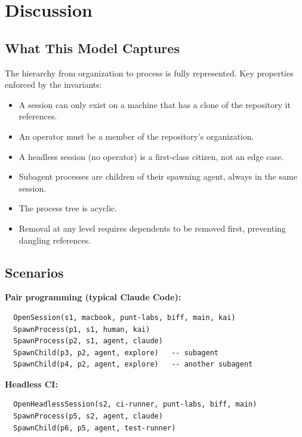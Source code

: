 \documentclass[a4paper,10pt,fleqn]{article}
\begin{document}
\section{Discussion}

\subsection{What This Model Captures}

The hierarchy from organization to process is fully represented.  Key
properties enforced by the invariants:

\begin{itemize}
  \item A session can only exist on a machine that has a clone of the
    repository it references.
  \item An operator must be a member of the repository's organization.
  \item A headless session (no operator) is a first-class citizen, not
    an edge case.
  \item Subagent processes are children of their spawning agent, always
    in the same session.
  \item The process tree is acyclic.
  \item Removal at any level requires dependents to be removed first,
    preventing dangling references.
\end{itemize}

\subsection{Scenarios}

\noindent\textbf{Pair programming (typical Claude Code):}

\begin{verbatim}
  OpenSession(s1, macbook, punt-labs, biff, main, kai)
  SpawnProcess(p1, s1, human, kai)
  SpawnProcess(p2, s1, agent, claude)
  SpawnChild(p3, p2, agent, explore)   -- subagent
  SpawnChild(p4, p2, agent, explore)   -- another subagent
\end{verbatim}

\noindent\textbf{Headless CI:}

\begin{verbatim}
  OpenHeadlessSession(s2, ci-runner, punt-labs, biff, main)
  SpawnProcess(p5, s2, agent, claude)
  SpawnChild(p6, p5, agent, test-runner)
\end{verbatim}
\end{document}
